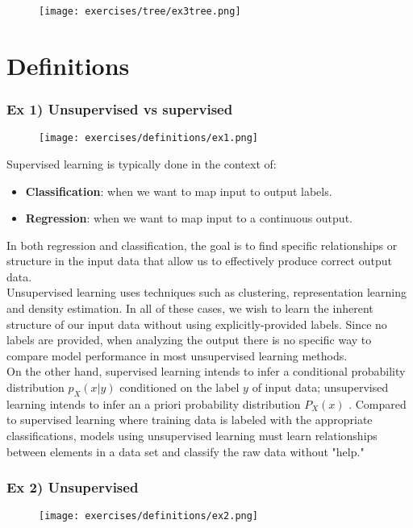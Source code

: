 \begin{figure}[H]
    \centering
    \texttt{[image: exercises/tree/ex3tree.png]}
\end{figure}

\section{Definitions}

\subsubsection{Ex 1) Unsupervised vs supervised}
\begin{figure}[H]
    \centering
    \texttt{[image: exercises/definitions/ex1.png]}
\end{figure}

Supervised learning is typically done in the context of:
\begin{itemize}
\item \textbf{Classification}: when we want to map input to output labels.
\item \textbf{Regression}: when we want to map input to a continuous output.
\end{itemize} 

In both regression and classification, the goal is to find specific relationships or structure in the input data that allow us to effectively produce correct output data.\\

Unsupervised learning uses techniques such as clustering, representation learning and density estimation. In all of these cases, we wish to learn the inherent structure of our input data without using explicitly-provided labels. Since no labels are provided, when analyzing the output there is no specific way to compare model performance in most unsupervised learning methods.\\
 
On the other hand, supervised learning  intends to infer a conditional probability distribution $p_X(x|y)$ conditioned on the label $y$ of input data; unsupervised learning intends to infer an a priori probability distribution $P_X(x)$ . Compared to supervised learning where training data is labeled with the appropriate classifications, models using unsupervised learning must learn relationships between elements in a data set and classify the raw data without "help."

\subsubsection{Ex 2) Unsupervised}
\begin{figure}[H]
    \centering
    \texttt{[image: exercises/definitions/ex2.png]}
\end{figure}

